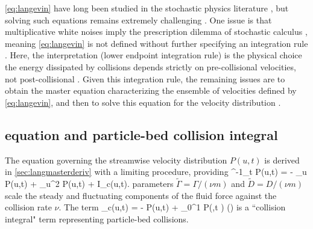 \DIFdelbegin {}\DIFdelend \DIFaddbegin {}\DIFaddend \ref{eq:langevin} have long been studied in the stochastic physics literature \citep{Hanggi1978,VanDenBroeck1983}, but solving such equations remains extremely challenging \citep{Daly2010,Mau2014,Dubkov2019}.
One issue is that multiplicative white noises imply the prescription dilemma of stochastic calculus \citep{Risken1989,Gardiner1983}, meaning \DIFaddbegin {}\DIFaddend \ref{eq:langevin} is not defined without further specifying an integration rule \citep{Suweis2011}.
Here, the \DIFdelbegin {}\DIFdelend \DIFaddbegin {}\DIFaddend interpretation (lower endpoint integration rule) is the physical choice the energy dissipated by collisions depends strictly on pre-collisional velocities, not post-collisional \citep[e.g.][]{Gardiner1983}\DIFdelbegin {}\DIFdelend .
Given this integration rule, the remaining issues are to obtain the master equation characterizing the ensemble of velocities defined by \DIFaddbegin {}\DIFaddend \ref{eq:langevin}, and then to solve this equation for the velocity distribution \DIFdelbegin {}\DIFdelend \DIFaddbegin {}\DIFaddend .

\subsection{\DIFdelbegin {}\DIFdelend \DIFaddbegin {}\DIFaddend equation and particle-bed collision integral}

The equation governing the streamwise velocity distribution $P(u,t)$ is derived in \DIFdelbegin {}\DIFdelend \DIFaddbegin {}\DIFaddend \ref{sec:langmasterderiv} with a limiting procedure, providing
\be \nu^{-1}\partial_t P(u,t) = - \tilde{\Gamma} \partial_u P(u,t) +  \partial_u^2 P(u,t) + I_c(u,t). \label{eq:master} \ee
\DIFdelbegin {}\DIFdelend \DIFaddbegin {}\DIFaddend parameters $\tilde{\Gamma} = \Gamma/(\nu m)$ and $\tilde{D} = D/(\nu m)$ \DIFdelbegin {}\DIFdelend scale the steady and fluctuating components of the fluid force against the collision rate $\nu$. The term
\be \DIFdelbegin {}\DIFdelend \DIFaddbegin {}\DIFaddend _c(u,t) = - P(u,t) + \int_0^1 P\big(,t \big) \rho(\ve) \label{eq:colint} \ee
is a ``collision integral" term representing particle-bed collisions.

